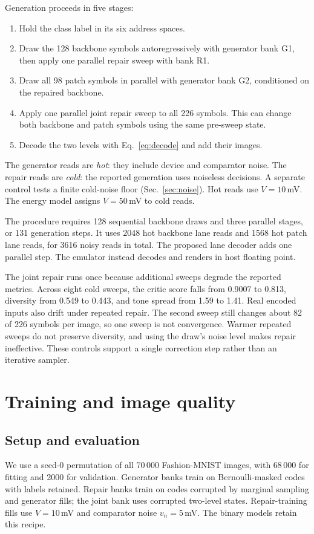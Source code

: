 \documentclass[reprint,amsmath,amssymb,aps,pra,floatfix,nofootinbib]{revtex4-2}
\begin{document}
Generation proceeds in five stages:
\begin{enumerate}
\item Hold the class label in its six address spaces.
\item Draw the 128 backbone symbols autoregressively with generator bank G1, then apply one parallel repair sweep with bank R1.
\item Draw all 98 patch symbols in parallel with generator bank G2, conditioned on the repaired backbone.
\item Apply one parallel joint repair sweep to all 226 symbols. This can change both backbone and patch symbols using the same pre-sweep state.
\item Decode the two levels with Eq.~\eqref{eq:decode} and add their images.
\end{enumerate}
The generator reads are \emph{hot}: they include device and comparator noise. The repair reads are \emph{cold}: the reported generation uses noiseless decisions. A separate control tests a finite cold-noise floor (Sec.~\ref{sec:noise}). Hot reads use $V=10$\,mV. The energy model assigns $V=50$\,mV to cold reads.

The procedure requires 128 sequential backbone draws and three parallel stages, or 131 generation steps. It uses 2048 hot backbone lane reads and 1568 hot patch lane reads, for 3616 noisy reads in total. The proposed lane decoder adds one parallel step. The emulator instead decodes and renders in host floating point.

The joint repair runs once because additional sweeps degrade the reported metrics. Across eight cold sweeps, the critic score falls from 0.9007 to 0.813, diversity from 0.549 to 0.443, and tone spread from 1.59 to 1.41. Real encoded inputs also drift under repeated repair. The second sweep still changes about 82 of 226 symbols per image, so one sweep is not convergence. Warmer repeated sweeps do not preserve diversity, and using the draw's noise level makes repair ineffective. These controls support a single correction step rather than an iterative sampler.

\section{Training and image quality}\label{sec:results}
\subsection{Setup and evaluation}
We use a seed-0 permutation of all 70\,000 Fashion-MNIST images, with 68\,000 for fitting and 2000 for validation. Generator banks train on Bernoulli-masked codes with labels retained. Repair banks train on codes corrupted by marginal sampling and generator fills; the joint bank uses corrupted two-level states. Repair-training fills use $V=10$\,mV and comparator noise $v_n=5$\,mV. The binary models retain this recipe.
\end{document}
